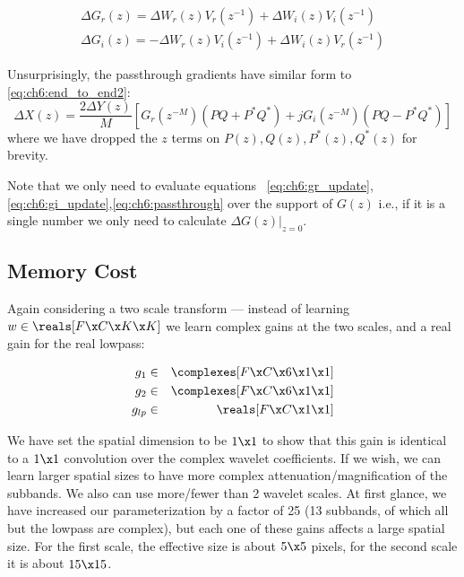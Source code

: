\begin{gather}
  \Delta G_r(z) = \Delta W_r(z) V_r(z^{-1}) + \Delta W_i(z) V_i(z^{-1})  \label{eq:ch6:gr_update}\\
  \Delta G_i(z) =  -\Delta W_r(z) V_i(z^{-1}) + \Delta W_i(z) V_r(z^{-1})  \label{eq:ch6:gi_update} 
\end{gather}

Unsurprisingly, the passthrough gradients have similar form to
\autoref{eq:ch6:end_to_end2}:
\begin{equation}\label{eq:ch6:passthrough}
    \Delta X(z) = \frac{2\Delta Y(z)}{M} \left[G_r(z^{-M})\left( PQ + P^*Q^* \right)\right. + 
      \left. jG_i(z^{-M}) \left(PQ-P^*Q^* \right) \right] 
\end{equation}
where we have dropped the $z$ terms on $P(z), Q(z), P^*(z), Q^*(z)$ for brevity.

Note that we only need to evaluate equations
~\ref{eq:ch6:gr_update},\ref{eq:ch6:gi_update},\ref{eq:ch6:passthrough} over the
support of $G(z)$ i.e., if it is a single number we only need to calculate
$\left.\Delta G(z)\right\rvert_{z=0}$.


\subsection{Memory Cost}
Again considering a two scale transform --- instead of learning $w\in \reals[F
\x C\x K\x K]$ we learn complex gains at the two scales, and a real gain for the
real lowpass:

\begin{eqnarray*}
  g_1 &\in& \complexes[F\x C\x 6\x 1\x 1] \\
  g_2 &\in& \complexes[F\x C\x 6\x 1\x 1] \\
  g_{lp} &\in& \reals[F\x C\x 1\x 1]
\end{eqnarray*}

We have set the spatial dimension to be $1\x 1$ to show that this gain is
identical to a $1\x 1$ convolution over the complex wavelet coefficients. If we
wish, we can learn larger spatial sizes to have more complex
attenuation/magnification of the subbands. We also can use more/fewer than
2 wavelet scales.  At first glance, we have increased our parameterization by
a factor of 25 (13 subbands, of which all but the lowpass are complex), but
each one of these gains affects a large spatial size. For the first scale, the
effective size is about $5\x 5$ pixels, for the second scale it is about $15\x
15$.

